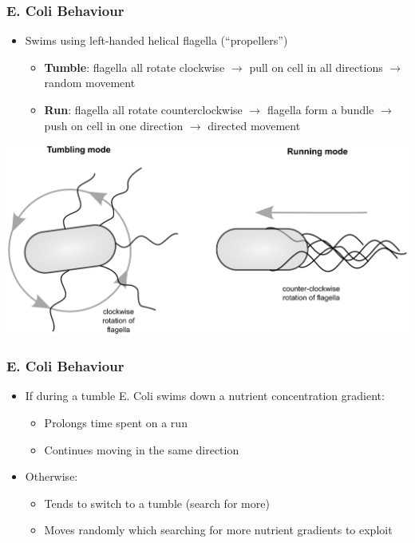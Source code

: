 \documentclass{beamer}
\begin{document}
\begin{frame}
\frametitle{E. Coli Behaviour}
\begin{itemize}
  \item Swims using left-handed helical flagella (``propellers'')
  \begin{itemize}
    \item \textbf{Tumble}: flagella all rotate clockwise $\to$ pull on cell in all directions $\to$ random movement
    \item \textbf{Run}: flagella all rotate counterclockwise $\to$ flagella form a bundle $\to$ push on cell in one direction $\to$ directed movement
  \end{itemize}
\end{itemize}
\begin{center}
\includegraphics[scale=0.2]{assets/ecoli}
\end{center}
\end{frame}

\begin{frame}
\frametitle{E. Coli Behaviour}
\begin{itemize}
  \item If during a tumble E. Coli swims down a nutrient concentration gradient:
  \begin{itemize}
    \item Prolongs time spent on a run
    \item Continues moving in the same direction
  \end{itemize}
  \item Otherwise:
  \begin{itemize}
    \item Tends to switch to a tumble (search for more)
    \item Moves randomly which searching for more nutrient gradients to exploit
  \end{itemize}
\end{itemize}
\end{frame}
\end{document}
